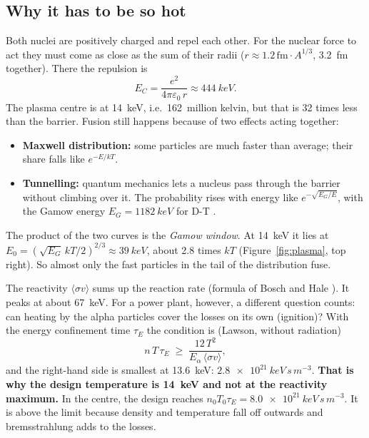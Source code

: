 \subsection{Why it has to be so hot}
Both nuclei are positively charged and repel each other. For the nuclear force to act they must come as close as the
sum of their radii ($r \approx 1.2\,\mathrm{fm}\cdot A^{1/3}$, \SI{3.2}{fm} together). There the repulsion is
\[ E_C = \frac{e^2}{4\pi\varepsilon_0\,r} \approx \SI{444}{keV}. \]
The plasma centre is at \SI{14}{keV}, i.e.\ 162~million kelvin, but that is 32 times less than the barrier. Fusion
still happens because of two effects acting together:
\begin{itemize}
\item \textbf{Maxwell distribution:} some particles are much faster than average; their share falls like
  $e^{-E/kT}$.
\item \textbf{Tunnelling:} quantum mechanics lets a nucleus pass through the barrier without climbing over it. The
  probability rises with energy like $e^{-\sqrt{E_G/E}}$, with the Gamow energy $E_G = \SI{1182}{keV}$ for D-T
  \cite{boschhale1992}.
\end{itemize}
The product of the two curves is the \emph{Gamow window}. At \SI{14}{keV} it lies at
$E_0 = (\sqrt{E_G}\,kT/2)^{2/3} \approx \SI{39}{keV}$, about 2.8 times $kT$ (Figure~\ref{fig:plasma}, top right).
So almost only the fast particles in the tail of the distribution fuse.

The reactivity $\langle\sigma v\rangle$ sums up the reaction rate (formula of Bosch and Hale \cite{boschhale1992}). It
peaks at about \SI{67}{keV}. For a power plant, however, a different question counts: can heating by the alpha particles
cover the losses on its own (ignition)? With the energy confinement time $\tau_E$ the condition is (Lawson, without
radiation)
\[ n\,T\,\tau_E \;\ge\; \frac{12\,T^2}{E_\alpha\,\langle\sigma v\rangle}, \]
and the right-hand side is smallest at \SI{13.6}{keV}: $\SI{2.8e21}{keV\,s\,m^{-3}}$. \textbf{That is why the design
temperature is \SI{14}{keV} and not at the reactivity maximum.} In the centre, the design reaches
$n_0 T_0 \tau_E = \SI{8.0e21}{keV\,s\,m^{-3}}$. It is above the limit because density and temperature fall off outwards
and bremsstrahlung adds to the losses.

